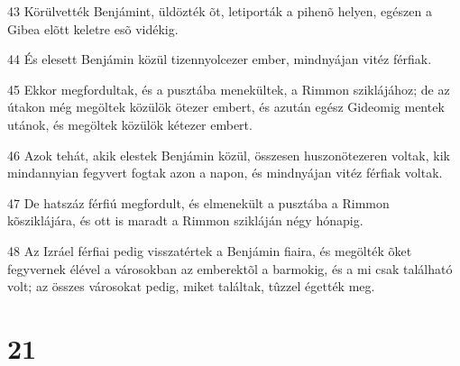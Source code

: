 \par 43 Körülvették Benjámint, üldözték õt, letiporták a pihenõ helyen, egészen a Gibea elõtt keletre esõ vidékig.
\par 44 És elesett Benjámin közül tizennyolcezer ember, mindnyájan vitéz férfiak.
\par 45 Ekkor megfordultak, és a pusztába menekültek, a Rimmon sziklájához; de az útakon még megöltek közülök ötezer embert, és azután egész Gideomig mentek utánok, és megöltek közülök kétezer embert.
\par 46 Azok tehát, akik elestek Benjámin közül, összesen huszonötezeren voltak, kik mindannyian fegyvert fogtak azon a napon, és mindnyájan vitéz férfiak voltak.
\par 47 De hatszáz férfiú megfordult, és elmenekült a pusztába a Rimmon kõsziklájára, és ott is maradt a Rimmon szikláján négy hónapig.
\par 48 Az Izráel férfiai pedig visszatértek a Benjámin fiaira, és megölték õket fegyvernek élével a városokban az emberektõl a barmokig, és a mi csak található volt; az összes városokat pedig, miket találtak, tûzzel égették meg.

\chapter{21}

